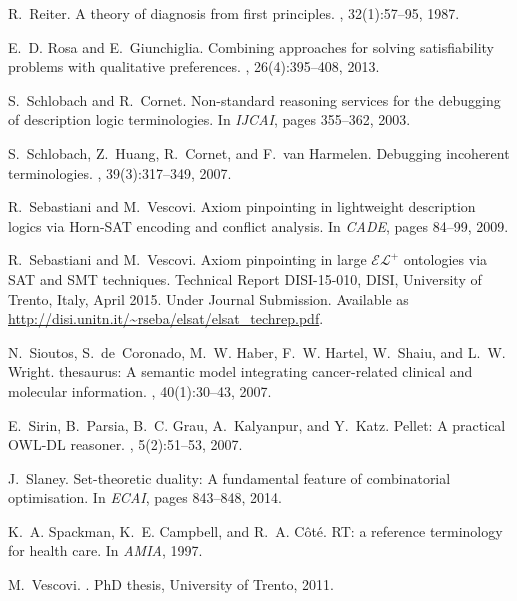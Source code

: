 \documentclass{llncs}
\begin{document}
\begin{thebibliography}{10}
R.~Reiter.
\newblock A theory of diagnosis from first principles.
, 32(1):57--95, 1987.

E.~D. Rosa and E.~Giunchiglia.
\newblock Combining approaches for solving satisfiability problems with
  qualitative preferences.
, 26(4):395--408, 2013.

S.~Schlobach and R.~Cornet.
\newblock Non-standard reasoning services for the debugging of description
  logic terminologies.
\newblock In {\em IJCAI}, pages 355--362, 2003.

S.~Schlobach, Z.~Huang, R.~Cornet, and F.~van Harmelen.
\newblock Debugging incoherent terminologies.
, 39(3):317--349, 2007.

R.~Sebastiani and M.~Vescovi.
\newblock Axiom pinpointing in lightweight description logics via {Horn-SAT}
  encoding and conflict analysis.
\newblock In {\em CADE}, pages 84--99, 2009.

R.~Sebastiani and M.~Vescovi.
\newblock Axiom pinpointing in large $\mathcal{EL}^+$ ontologies via {SAT} and
  {SMT} techniques.
\newblock Technical Report DISI-15-010, DISI, University of Trento, Italy,
  April 2015.
\newblock Under Journal Submission. Available as
  \url{http://disi.unitn.it/~rseba/elsat/elsat_techrep.pdf}.

N.~Sioutos, S.~de~Coronado, M.~W. Haber, F.~W. Hartel, W.~Shaiu, and L.~W.
  Wright.
 thesaurus: {A} semantic model integrating cancer-related
  clinical and molecular information.
, 40(1):30--43, 2007.

E.~Sirin, B.~Parsia, B.~C. Grau, A.~Kalyanpur, and Y.~Katz.
\newblock Pellet: {A} practical {OWL-DL} reasoner.
, 5(2):51--53, 2007.

J.~Slaney.
\newblock Set-theoretic duality: {A} fundamental feature of combinatorial
  optimisation.
\newblock In {\em ECAI}, pages 843--848, 2014.

K.~A. Spackman, K.~E. Campbell, and R.~A. C{\^{o}}t{\'{e}}.
 {RT:} a reference terminology for health care.
\newblock In {\em AMIA}, 1997.

M.~Vescovi.
.
\newblock PhD thesis, University of Trento, 2011.

\end{thebibliography}
\end{document}
